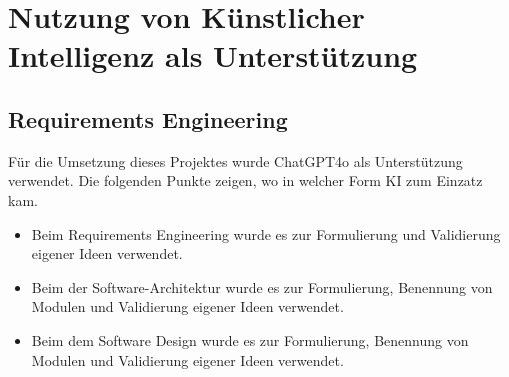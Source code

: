 \documentclass[a4paper,12pt]{article}
\begin{document}
\newpage

\section*{Nutzung von Künstlicher Intelligenz als Unterstützung}

\subsection*{Requirements Engineering}

Für die Umsetzung dieses Projektes wurde ChatGPT4o als Unterstützung verwendet. Die folgenden Punkte zeigen, wo in welcher Form KI zum Einzatz kam.

\begin{itemize}
    \item Beim Requirements Engineering wurde es zur Formulierung und Validierung eigener Ideen verwendet.
    \item Beim der Software-Architektur wurde es zur Formulierung, Benennung von Modulen und Validierung eigener Ideen verwendet.
    \item Beim dem Software Design wurde es zur Formulierung, Benennung von Modulen und Validierung eigener Ideen verwendet.
\end{itemize}
\end{document}

